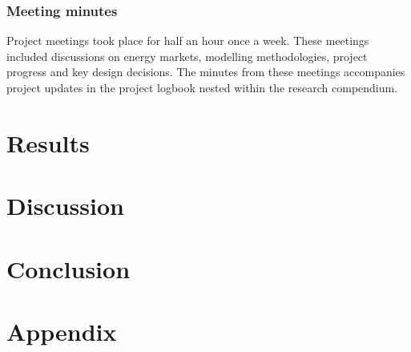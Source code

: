 \documentclass[12pt]{article}
\begin{document}
\subsubsection{Meeting minutes}
Project meetings took place for half an hour once a week. 
These meetings included discussions on energy markets, modelling methodologies, project progress and key design decisions.
The minutes from these meetings accompanies project updates in the project logbook nested within the research compendium.

\section{Results}

\section{Discussion}

\section{Conclusion}
\newpage
\section{Appendix}
\end{document}
